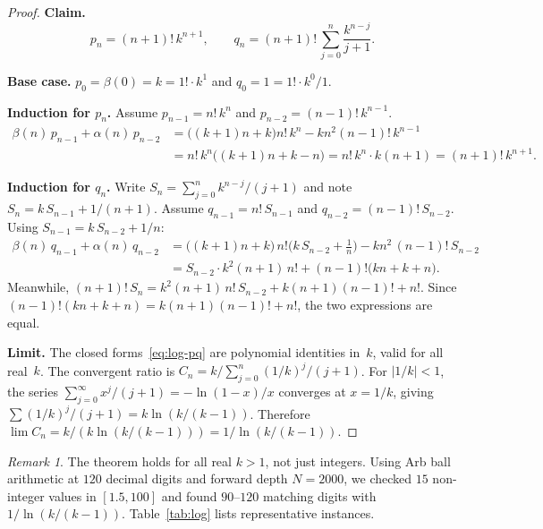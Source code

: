 \documentclass[11pt,a4paper]{article}
\theoremstyle{plain}
\theoremstyle{definition}
\theoremstyle{remark}
\newtheorem{remark}[theorem]{Remark}
\begin{document}
\begin{proof}
\textbf{Claim.}
\begin{equation}\label{eq:log-pq}
  p_n = (n{+}1)!\, k^{n+1}, \qquad
  q_n = (n{+}1)!\, \sum_{j=0}^{n} \frac{k^{n-j}}{j+1}.
\end{equation}

\textbf{Base case.}
$p_0 = \beta(0) = k = 1!\cdot k^1$ and $q_0 = 1 = 1!\cdot k^0/1$.

\medskip\noindent\textbf{Induction for $p_n$.}
Assume $p_{n-1} = n!\,k^n$ and $p_{n-2} = (n{-}1)!\,k^{n-1}$.
\begin{align*}
  \beta(n)\,p_{n-1} + \alpha(n)\,p_{n-2}
  &= \bigl((k{+}1)n + k\bigr) n!\,k^n - kn^2 (n{-}1)!\,k^{n-1} \\
  &= n!\,k^n\bigl((k{+}1)n + k - n\bigr)
   = n!\,k^n \cdot k(n{+}1) = (n{+}1)!\,k^{n+1}.
\end{align*}

\medskip\noindent\textbf{Induction for $q_n$.}
Write $S_n = \sum_{j=0}^{n} k^{n-j}/(j{+}1)$
and note $S_n = k\,S_{n-1} + 1/(n{+}1)$.
Assume $q_{n-1} = n!\,S_{n-1}$ and $q_{n-2} = (n{-}1)!\,S_{n-2}$.
Using $S_{n-1} = k\,S_{n-2} + 1/n$:
\begin{align*}
\beta(n)\,q_{n-1} + \alpha(n)\,q_{n-2}
&= \bigl((k{+}1)n{+}k\bigr)\,n!\bigl(k\,S_{n-2}+\tfrac{1}{n}\bigr)
   - kn^2\,(n{-}1)!\,S_{n-2} \\
&= S_{n-2}\cdot k^2(n{+}1)\,n!
   + (n{-}1)!\bigl(kn+k+n\bigr).
\end{align*}
Meanwhile,
$(n{+}1)!\,S_n
= k^2(n{+}1)\,n!\,S_{n-2} + k(n{+}1)(n{-}1)! + n!$.
Since $(n{-}1)!(kn{+}k{+}n) = k(n{+}1)(n{-}1)! + n!$,
the two expressions are equal.

\medskip\noindent\textbf{Limit.}
The closed forms~\eqref{eq:log-pq} are polynomial identities in~$k$,
valid for all real~$k$.
The convergent ratio is
$C_n = k/\sum_{j=0}^{n}(1/k)^j/(j{+}1)$.
For $|1/k| < 1$, the series
$\sum_{j=0}^{\infty} x^j/(j{+}1) = -\ln(1{-}x)/x$
converges at $x = 1/k$, giving
$\sum (1/k)^j/(j{+}1) = k\ln(k/(k{-}1))$.
Therefore
$\lim C_n = k/(k\ln(k/(k{-}1))) = 1/\ln(k/(k{-}1))$.
\end{proof}

\begin{remark}
The theorem holds for all real $k > 1$, not just integers.
Using Arb ball arithmetic at $120$ decimal digits and forward depth
$N=2000$, we checked $15$ non-integer values in $[1.5,100]$ and found
$90$--$120$ matching digits with $1/\ln(k/(k{-}1))$.
Table~\ref{tab:log} lists representative instances.
\end{remark}
\end{document}
